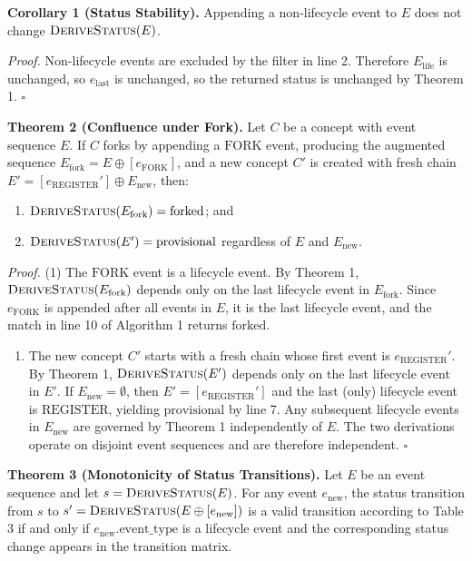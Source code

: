 \textbf{Corollary 1 (Status Stability).} Appending a non-lifecycle event to \(E\) does not change \(\textsc{DeriveStatus}(E)\).

\emph{Proof.} Non-lifecycle events are excluded by the filter in line 2. Therefore \(E_{\text{life}}\) is unchanged, so \(e_{\text{last}}\) is unchanged, so the returned status is unchanged by Theorem 1. \(\square\)

\textbf{Theorem 2 (Confluence under Fork).} Let \(C\) be a concept with event sequence \(E\). If \(C\) forks by appending a \(\text{FORK}\) event, producing the augmented sequence \(E_{\text{fork}} = E \oplus [e_{\text{FORK}}]\), and a new concept \(C'\) is created with fresh chain \(E' = [e_{\text{REGISTER}}'] \oplus E_{\text{new}}\), then:

\begin{enumerate}
\def\labelenumi{\arabic{enumi}.}
\tightlist
\item
  \(\textsc{DeriveStatus}(E_{\text{fork}}) = \text{forked}\); and
\item
  \(\textsc{DeriveStatus}(E') = \text{provisional}\) regardless of \(E\) and \(E_{\text{new}}\).
\end{enumerate}

\emph{Proof.} (1) The \(\text{FORK}\) event is a lifecycle event. By Theorem 1, \(\textsc{DeriveStatus}(E_{\text{fork}})\) depends only on the last lifecycle event in \(E_{\text{fork}}\). Since \(e_{\text{FORK}}\) is appended after all events in \(E\), it is the last lifecycle event, and the match in line 10 of Algorithm 1 returns \(\text{forked}\).

\begin{enumerate}
\def\labelenumi{(\arabic{enumi})}
\setcounter{enumi}{1}
\tightlist
\item
  The new concept \(C'\) starts with a fresh chain whose first event is \(e_{\text{REGISTER}}'\). By Theorem 1, \(\textsc{DeriveStatus}(E')\) depends only on the last lifecycle event in \(E'\). If \(E_{\text{new}} = \emptyset\), then \(E' = [e_{\text{REGISTER}}']\) and the last (only) lifecycle event is \(\text{REGISTER}\), yielding \(\text{provisional}\) by line 7. Any subsequent lifecycle events in \(E_{\text{new}}\) are governed by Theorem 1 independently of \(E\). The two derivations operate on disjoint event sequences and are therefore independent. \(\square\)
\end{enumerate}

\textbf{Theorem 3 (Monotonicity of Status Transitions).} Let \(E\) be an event sequence and let \(s = \textsc{DeriveStatus}(E)\). For any event \(e_{\text{new}}\), the status transition from \(s\) to \(s' = \textsc{DeriveStatus}(E \oplus [e_{\text{new}}])\) is a valid transition according to Table 3 if and only if \(e_{\text{new}}.\text{event\_type}\) is a lifecycle event and the corresponding status change appears in the transition matrix.

